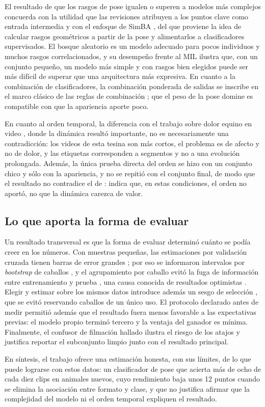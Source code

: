 El resultado de que los rasgos de pose igualen o superen a modelos más complejos concuerda con la utilidad que las revisiones atribuyen a los puntos clave como entrada intermedia \parencite{broome2023,mathis2018} y con el enfoque de SimBA \parencite{goodwin2024}, del que proviene la idea de calcular rasgos geométricos a partir de la pose y alimentarlos a clasificadores supervisados. El bosque aleatorio \parencite{breiman2001} es un modelo adecuado para pocos individuos y muchos rasgos correlacionados, y su desempeño frente al MIL ilustra que, con un conjunto pequeño, un modelo más simple y con rasgos bien elegidos puede ser más difícil de superar que una arquitectura más expresiva. En cuanto a la combinación de clasificadores, la combinación ponderada de salidas se inscribe en el marco clásico de las reglas de combinación \parencite{kittler1998}; que el peso de la pose domine es compatible con que la apariencia aporte poco.

En cuanto al orden temporal, la diferencia con el trabajo sobre dolor equino en video \parencite{broome2019}, donde la dinámica resultó importante, no es necesariamente una contradicción: los videos de esta tesina son más cortos, el problema es de afecto y no de dolor, y las etiquetas corresponden a segmentos y no a una evolución prolongada. Además, la única prueba directa del orden se hizo con un conjunto chico y sólo con la apariencia, y no se repitió con el conjunto final, de modo que el resultado no contradice el de \textcite{broome2019}: indica que, en estas condiciones, el orden no aportó, no que la dinámica carezca de valor.

\subsection{Lo que aporta la forma de evaluar}
Un resultado transversal es que la forma de evaluar determinó cuánto se podía creer en los números. Con muestras pequeñas, las estimaciones por validación cruzada tienen barras de error grandes \parencite{varoquaux2018}; por eso se informaron intervalos por \textit{bootstrap} de caballos \parencite{efron1993}, y el agrupamiento por caballo evitó la fuga de información entre entrenamiento y prueba \parencite{roberts2017,kaufman2012}, una causa conocida de resultados optimistas \parencite{kapoor2023}. Elegir y estimar sobre los mismos datos introduce además un sesgo de selección \parencite{cawley2010}, que se evitó reservando \CaballosReserva{} caballos de un único uso. El protocolo declarado antes de medir permitió además que el resultado fuera menos favorable a las expectativas previas: el modelo propio terminó tercero y la ventaja del ganador es mínima. Finalmente, el confusor de filmación hallado ilustra el riesgo de los atajos \parencite{geirhos2020} y justifica reportar el subconjunto limpio junto con el resultado principal.

En síntesis, el trabajo ofrece una estimación honesta, con sus límites, de lo que puede lograrse con estos datos: un clasificador de pose que acierta más de ocho de cada diez clips en animales nuevos, cuyo rendimiento baja unos 12 puntos cuando se elimina la asociación entre formato y clase, y que no justifica afirmar que la complejidad del modelo ni el orden temporal expliquen el resultado.
